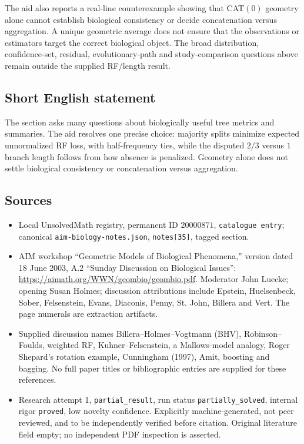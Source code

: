 \documentclass[11pt]{article}
\begin{document}
The aid also reports a real-line counterexample showing that CAT$(0)$ geometry alone cannot establish biological consistency or decide concatenation versus aggregation. A unique geometric average does not ensure that the observations or estimators target the correct biological object. The broad distribution, confidence-set, residual, evolutionary-path and study-comparison questions above remain outside the supplied RF/length result.
\subsection{Short English statement}
The section asks many questions about biologically useful tree metrics and summaries. The aid resolves one precise choice: majority splits minimize expected unnormalized RF loss, with half-frequency ties, while the disputed $2/3$ versus $1$ branch length follows from how absence is penalized. Geometry alone does not settle biological consistency or concatenation versus aggregation.
\subsection{Sources}
\begin{itemize}
\item Local UnsolvedMath registry, permanent ID $20000871$, \texttt{catalogue entry}; canonical \texttt{aim-biology-notes.json}, \texttt{notes[35]}, tagged section.
\item AIM workshop ``Geometric Models of Biological Phenomena,'' version dated 18 June 2003, A.2 ``Sunday Discussion on Biological Issues'': \url{https://aimath.org/WWN/geombio/geombio.pdf}. Moderator John Luecke; opening Susan Holmes; discussion attributions include Epstein, Huelsenbeck, Sober, Felsenstein, Evans, Diaconis, Penny, St. John, Billera and Vert. The page numerals are extraction artifacts.
\item Supplied discussion names Billera--Holmes--Vogtmann (BHV), Robinson--Foulds, weighted RF, Kuhner--Felsenstein, a Mallows-model analogy, Roger Shepard's rotation example, Cunningham (1997), Amit, boosting and bagging. No full paper titles or bibliographic entries are supplied for these references.
\item Research attempt 1, \texttt{partial\_result}, run status \texttt{partially\_solved}, internal rigor \texttt{proved}, low novelty confidence. Explicitly machine-generated, not peer reviewed, and to be independently verified before citation. Original literature field empty; no independent PDF inspection is asserted.
\end{itemize}
\end{document}
